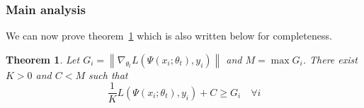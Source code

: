 \documentclass{article}
\newcommand{\norm}[1]{\left\lVert #1 \right\rVert}
\newtheorem{theorem}{Theorem}
\begin{document}
\subsubsection{Main analysis} \label{sec:theoretical_main}

We can now prove theorem~\ref{the:loss_upper_bound} which is also written below
for completeness.

\begin{theorem} \label{the:loss_upper_bound}
Let $G_i = \norm{\nabla_{\theta_t} L(\Psi(x_i; \theta_t), y_i)}$ and $M = \max
G_i$. There exist $K > 0$ and $C < M$ such that
\begin{equation}
\frac{1}{K} L(\Psi(x_i; \theta_t), y_i) + C \geq G_i \quad \forall i
\end{equation}
\end{theorem}
\end{document}
